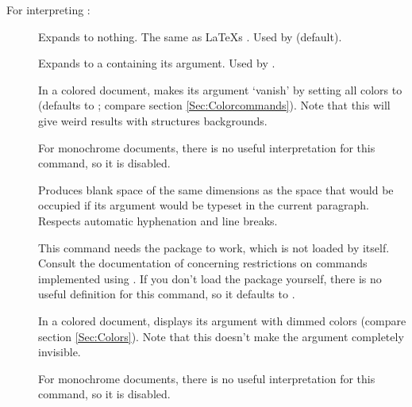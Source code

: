   \newslide

  For interpreting :
  \begin{description}
  \item[] Expands to nothing. The same as \LaTeX s . Used by
     (default).

  \item[] Expands to a  containing its argument. Used by
    .
    
  \item[] In a colored document, makes its argument `vanish' by setting all colors to
     (defaults to ; compare section \ref{Sec:Colorcommands}). Note that this will
    give weird results with structures backgrounds.

    For monochrome documents, there is no useful interpretation for this command, so it is disabled.

    \newslide
    
  \item[{}] Produces blank space of the same dimensions as the space that would be
    occupied if its argument would be typeset in the current paragraph. Respects automatic hyphenation and line breaks.
    
    This command needs the \href{ftp://ftp.dante.de/tex-archive/help/Catalogue/entries/soul.html}{} package
    to work, which is not loaded by  itself. Consult the documentation of
    \href{ftp://ftp.dante.de/tex-archive/help/Catalogue/entries/soul.html}{} concerning restrictions on
    commands implemented using . If you don't load the  package yourself, there is no useful
    definition for this command, so it defaults to .

    \newslide
    
  \item[] In a colored document, displays its argument with dimmed colors (compare
    section \ref{Sec:Colors}). Note that this doesn't make the argument completely invisible.

    For monochrome documents, there is no useful interpretation for this command, so it is disabled.
  \end{description}

